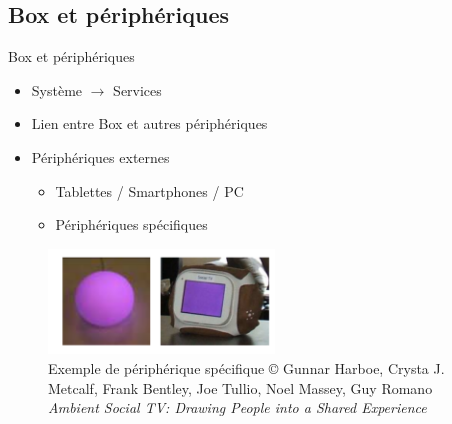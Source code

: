 \documentclass{beamer}
\begin{document}
	\subsection{Box et périphériques}
	\begin{frame}{Box et périphériques}
		\begin{itemize}
			\item Système $\rightarrow$ Services
		\pause
			\item Lien entre Box et autres périphériques
		\pause
			\item Périphériques externes
				\begin{itemize}
					\item Tablettes / Smartphones / PC
					\item Périphériques spécifiques
				\end{itemize}
		\end{itemize}
						\begin{figure}[H]
							\centering
							\includegraphics[width=6cm]{images/otherDevice.png}
							\caption{Exemple de périphérique
							spécifique\newline
							\tiny © Gunnar Harboe, Crysta J.  Metcalf, Frank Bentley, Joe Tullio, Noel Massey, Guy Romano\newline
							\textit{Ambient Social TV: Drawing People into a Shared Experience}
							}
						\end{figure}
	\end{frame}
\end{document}

